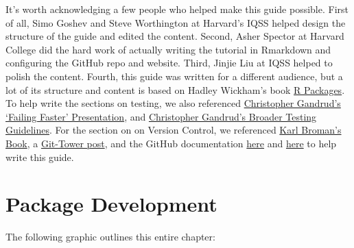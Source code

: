 \documentclass[
]{book}
\begin{document}
It's worth acknowledging a few people who helped make this guide possible. First of all, Simo Goshev and Steve Worthington at Harvard's IQSS helped design the structure of the guide and edited the content. Second, Asher Spector at Harvard College did the hard work of actually writing the tutorial in Rmarkdown and configuring the GitHub repo and website. Third, Jinjie Liu at IQSS helped to polish the content. Fourth, this guide was written for a different audience, but a lot of its structure and content is based on Hadley Wickham's book \href{http://r-pkgs.had.co.nz/}{R Packages}. To help write the sections on testing, we also referenced \href{http://slides.com/christophergandrud/failing-faster\#/24}{Christopher Gandrud's `Failing Faster' Presentation}, and \href{https://github.com/IQSS/social_science_software_toolkit/blob/master/testing/recommended_testing_tools_R.md\#recommended-testing-tools-and-process-for-r-packages}{Christopher Gandrud's Broader Testing Guidelines}. For the section on on Version Control, we referenced \href{https://kbroman.org/github_tutorial/}{Karl Broman's Book}, a \href{https://www.git-tower.com/learn/git/faq/restore-repo-to-previous-revision}{Git-Tower post}, and the GitHub documentation \href{https://git-scm.com/book/en/v2/Getting-Started-Git-Basics}{here} and \href{https://git-scm.com/book/en/v2/Getting-Started-First-Time-Git-Setup}{here} to help write this guide.

\hypertarget{package-development}{%
\chapter{Package Development}\label{package-development}}

The following graphic outlines this entire chapter:
\end{document}
